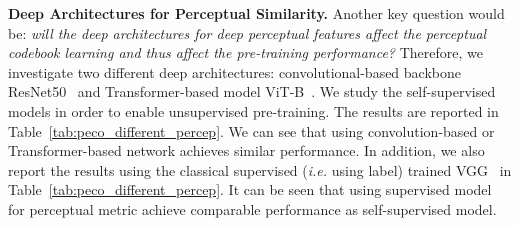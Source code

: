 \documentclass[letterpaper]{article} \usepackage{aaai23}  \usepackage{times}  \usepackage{helvet}  \usepackage{courier}  \usepackage[hyphens]{url}  \usepackage{graphicx} \urlstyle{rm} \def\UrlFont{\rm}  \usepackage{natbib}  \usepackage{caption} \frenchspacing  \setlength{\pdfpagewidth}{8.5in}  \setlength{\pdfpageheight}{11in}  \usepackage{algorithm}
\newcommand{\ie}{\textit{i.e. }}
\begin{document}
\begin{table}[t]
\centering
\footnotesize
{}
\caption{Evaluation of the semantics of the codewords
from linear probling accuracy (\%) of codewords on ImageNet-K and classification accuracy (\%) on the reconstructed ImageNet validation images using Deit-T. }
\label{tab:vae_acc}
\end{table}
\begin{table}[t]
\centering
{}
\caption{The performance comparison when using different architectures for calculating the perceptual similarity. }
\label{tab:peco_different_percep}
\end{table}



\noindent \textbf{Deep Architectures for Perceptual Similarity.}
Another key question would be:
\emph{will the deep architectures for deep perceptual features affect the perceptual codebook learning and thus affect the pre-training performance?}
Therefore, we investigate two different deep architectures: convolutional-based backbone ResNet50~\cite{he2016deep} and Transformer-based model ViT-B~\cite{dosovitskiy2020image}.
We study the self-supervised models in order to enable unsupervised pre-training. 
The results are reported in Table~\ref{tab:peco_different_percep}.
We can see that using convolution-based or Transformer-based network achieves similar performance.
In addition, we also report the results using the classical supervised (\ie using label) trained VGG~\cite{simonyan2014very} in Table~\ref{tab:peco_different_percep}. It can be seen that using supervised model for perceptual metric achieve comparable performance as self-supervised model.
\end{document}
